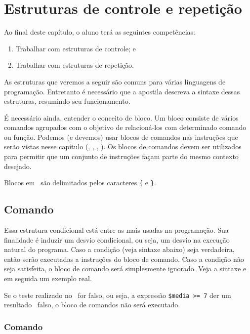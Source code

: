 \chapter{Estruturas de controle e repetição}

Ao final deste capítulo, o aluno terá as seguintes competências:
\begin{enumerate}
    \item Trabalhar com estruturas de controle; e 
    \item Trabalhar com estruturas de repetição.
\end{enumerate}

As estruturas que veremos a seguir são comuns para várias linguagens de programação.
Entretanto é necessário que a apostila descreva a sintaxe dessas estruturas, resumindo
seu funcionamento.

É necessário ainda, entender o conceito de bloco. Um bloco consiste de vários
comandos agrupados com o objetivo de relacioná-los com determinado comando
ou função. Podemos (e devemos) usar blocos de comandos nas instruções que serão
vistas nesse capítulo (\comandoif, \comandofor, \comandowhile, \comandoswitch).
Os blocos de comandos devem ser utilizados para permitir que um conjunto de instruções
façam parte do mesmo contexto desejado.

Blocos em \php~são delimitados pelos caracteres \texttt{\{} e \texttt{\}}.

\section{Comando \comandoif}
\label{comando-if}

Essa estrutura condicional está entre as mais usadas na programação. Sua finalidade é induzir um 
desvio condicional, ou seja, um desvio na execução natural do programa. Caso a condição (veja sintaxe abaixo) 
seja verdadeira, então serão executadas a instruções do bloco de comando. 
Caso a condição não seja satisfeita, o bloco de comando será simplesmente ignorado. 
Veja a sintaxe e em seguida um exemplo real.



Se o teste realizado no \comandoif~for falso, ou seja, a expressão \texttt{\$media >= 7} der um
resultado \booleano~falso, o bloco de comandos não será executado.

\subsection{Comando \comandoifelse}
\label{comando-if-else}


